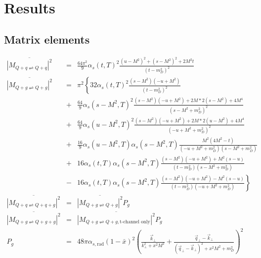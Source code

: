\documentclass[aps, prc, reprint, amsmath, groupedaddress, nofootinbib]{revtex4-1}
\begin{document}
\section{Results}

\begin{appendices}
\section{Matrix elements}
\label{appendix:matrix-element}
\begin{widetext}
\begin{eqnarray}
\overline{|M_{Q+q\rightleftharpoons Q+q}|^2} &=& \frac{64\pi^2}{9}\alpha_s(t, T)^2 \frac{(u-M^2)^2 + (s-M^2)^2 + 2 M^2 t}{(t-m_D^2)^2}\\
\overline{|M_{Q+g\rightleftharpoons Q+g}|^2} &=& \pi^2 \left\{
32\alpha_s(t,T)^2 \frac{(s-M^2)(-u+M^2)}{(t-m_D^2)^2} \right. \\ \nonumber
&+&\frac{64}{9}\alpha_s(s-M^2, T)^2 \frac{(s-M^2)(-u+M^2)+2M*2(s-M^2) + 4M^4}{(s-M^2+m_D^2)^2} \\ \nonumber
&+&\frac{64}{9}\alpha_s(u-M^2, T)^2 \frac{(s-M^2)(-u+M^2)+2M*2(u-M^2) + 4M^4}{(-u+M^2+m_D^2)^2} \\ \nonumber
&+&\frac{16}{9}\alpha_s(u-M^2, T)\alpha_s(s-M^2, T) \frac{M^2(4M^2 - t)}{(-u+M^2+m_D^2)(s-M^2+m_D^2)} \\ \nonumber
&+& 16 \alpha_s(t, T)\alpha_s(s-M^2, T) \frac{(s-M^2)(-u+M^2)+M^2(s-u)}{(t-m_D^2)(s-M^2+m_D^2)} \\ \nonumber
&-& \left. 16 \alpha_s(t, T)\alpha_s(s-M^2, T) \frac{(s-M^2)(-u+M^2)-M^2(s-u)}{(t-m_D^2)(-u+M^2+m_D^2)}\right\} \\
\overline{|M_{Q+q\rightleftharpoons Q+q+g}|^2} &=& \overline{|M_{Q+g\rightleftharpoons Q+g}|^2} P_g \\
\overline{|M_{Q+g\rightleftharpoons Q+g+g}|^2} &=& \overline{|M_{Q+g\rightleftharpoons Q+g, \textrm{t-channel only}}|^2} P_g \\
P_g &=& 48 \pi \alpha_{s, \textrm{rad}} (1-\bar{x})^2 \left(\frac{\vec{k}_\perp}{k_\perp^2 + x^2 M^2} 
+ \frac{\vec{q}_\perp - \vec{k}_\perp}{(\vec{q}_\perp-\vec{k}_\perp)^2 + x^2 M^2 + m_D^2}
\right)^2 
\end{eqnarray}
\end{widetext}


\end{appendices}
\end{document}
